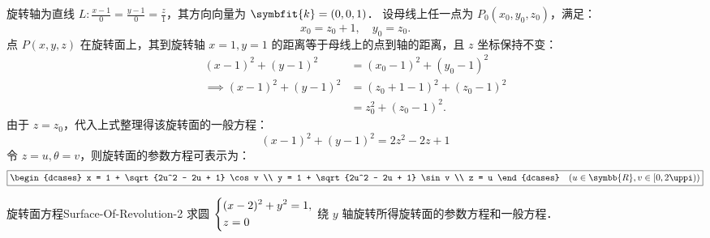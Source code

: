 \begin{solution}
    旋转轴为直线 $L: \frac{x-1}{0} = \frac{y-1}{0} = \frac{z}{1}$，其方向向量为 $\symbfit{k} = (0, 0, 1)$．
    设母线上任一点为 $P_0(x_0, y_0, z_0)$，满足：
    \begin{equation}
        x_0 = z_0 + 1, \quad y_0 = z_0.
    \end{equation}
    点 $P(x, y, z)$ 在旋转面上，其到旋转轴 $x=1, y=1$ 的距离等于母线上的点到轴的距离，且 $z$ 坐标保持不变：
    \begin{equation}
        \begin{aligned}
            (x - 1)^2 + (y - 1)^2          & = (x_0 - 1)^2 + (y_0 - 1)^2     \\
            \implies (x - 1)^2 + (y - 1)^2 & = (z_0 + 1 - 1)^2 + (z_0 - 1)^2 \\
                                           & = z_0^2 + (z_0 - 1)^2.
        \end{aligned}
    \end{equation}
    由于 $z = z_0$，代入上式整理得该旋转面的一般方程：
    \begin{equation}
        \boxed{(x - 1)^2 + (y - 1)^2 = 2z^2 - 2z + 1}
    \end{equation}
    令 $z = u, \theta = v$，则旋转面的参数方程可表示为：
    \begin{equation}
        \boxed{\begin{dcases}
            x = 1 + \sqrt{2u^2 - 2u + 1} \cos v \\
            y = 1 + \sqrt{2u^2 - 2u + 1} \sin v \\
            z = u
        \end{dcases} \quad (u \in \symbb{R}, v \in [0, 2\uppi))}
    \end{equation}
\end{solution}


\begin{problem}{旋转面方程}{Surface-Of-Revolution-2}
    求圆 $\begin{dcases} (x - 2)^2 + y^2 = 1, \\ z = 0 \end{dcases}$ 绕 $y$ 轴旋转所得旋转面的参数方程和一般方程．
\end{problem}

